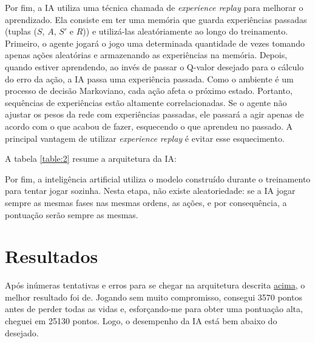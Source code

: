 Por fim, a IA utiliza uma técnica chamada de \textit{experience replay} para melhorar o aprendizado. Ela consiste em ter uma memória que guarda experiências passadas (tuplas ($S$, $A$, $S'$ e $R$)) e utilizá-las aleatóriamente ao longo do treinamento.
Primeiro, o agente jogará o jogo uma determinada quantidade de vezes tomando apenas ações aleatórias e armazenando as experiências na memória.
Depois, quando estiver aprendendo, ao invés de passar o Q-valor desejado para o cálculo do erro da ação, a IA passa uma experiência passada.
Como o ambiente é um processo de decisão Markoviano, cada ação afeta o próximo estado. Portanto, sequências de experiências estão altamente correlacionadas. Se o agente não ajustar os pesos da rede com experiências passadas, ele passará a agir apenas de acordo com o que acabou de fazer, esquecendo o que aprendeu no passado.
A principal vantagem de utilizar \textit{experience replay} é evitar esse esquecimento.

A tabela \ref{table:2} resume a arquitetura da IA:

Por fim, a inteligência artificial utiliza o modelo construído durante o treinamento para tentar jogar sozinha. Nesta etapa, não existe aleatoriedade: se a IA jogar sempre as mesmas fases nas mesmas ordens, as ações, e por consequência, a pontuação serão sempre as mesmas.

\section{Resultados}
\label{sec:res}

Após inúmeras tentativas e erros para se chegar na arquitetura descrita \hyperref[table:2]{acima}, o melhor resultado foi de.
Jogando sem muito compromisso, consegui 3570 pontos antes de perder todas as vidas e, esforçando-me para obter uma pontuação alta, cheguei em 25130 pontos. Logo, o desempenho da IA está bem abaixo do desejado.
